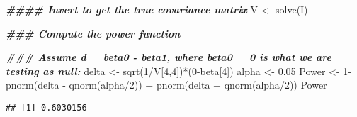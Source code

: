 \documentclass[
]{article}
\newenvironment{Shaded}{\begin{snugshade}}{\end{snugshade}}
\newcommand{\AttributeTok}[1]{\textcolor[rgb]{0.77,0.63,0.00}{#1}}
\newcommand{\ControlFlowTok}[1]{\textcolor[rgb]{0.13,0.29,0.53}{\textbf{#1}}}
\newcommand{\DecValTok}[1]{\textcolor[rgb]{0.00,0.00,0.81}{#1}}
\newcommand{\DocumentationTok}[1]{\textcolor[rgb]{0.56,0.35,0.01}{\textbf{\textit{#1}}}}
\newcommand{\FloatTok}[1]{\textcolor[rgb]{0.00,0.00,0.81}{#1}}
\newcommand{\FunctionTok}[1]{\textcolor[rgb]{0.00,0.00,0.00}{#1}}
\newcommand{\NormalTok}[1]{#1}
\newcommand{\OtherTok}[1]{\textcolor[rgb]{0.56,0.35,0.01}{#1}}
\newcommand{\SpecialCharTok}[1]{\textcolor[rgb]{0.00,0.00,0.00}{#1}}
\newcommand{\StringTok}[1]{\textcolor[rgb]{0.31,0.60,0.02}{#1}}
\begin{document}
\begin{Shaded}
\begin{Highlighting}[]
\DocumentationTok{\#\#\#\# Invert to get the true covariance matrix }
\NormalTok{V }\OtherTok{\textless{}{-}} \FunctionTok{solve}\NormalTok{(I)}


\DocumentationTok{\#\#\# Compute the power function }

\DocumentationTok{\#\#\# Assume d = beta0 {-} beta1, where beta0 = 0 is what we are testing as null:}
\NormalTok{delta }\OtherTok{\textless{}{-}} \FunctionTok{sqrt}\NormalTok{(}\DecValTok{1}\SpecialCharTok{/}\NormalTok{V[}\DecValTok{4}\NormalTok{,}\DecValTok{4}\NormalTok{])}\SpecialCharTok{*}\NormalTok{(}\DecValTok{0}\SpecialCharTok{{-}}\NormalTok{beta[}\DecValTok{4}\NormalTok{])}
\NormalTok{alpha }\OtherTok{\textless{}{-}} \FloatTok{0.05}
\NormalTok{Power }\OtherTok{\textless{}{-}} \DecValTok{1}\SpecialCharTok{{-}} \FunctionTok{pnorm}\NormalTok{(delta }\SpecialCharTok{{-}} \FunctionTok{qnorm}\NormalTok{(alpha}\SpecialCharTok{/}\DecValTok{2}\NormalTok{)) }\SpecialCharTok{+} \FunctionTok{pnorm}\NormalTok{(delta }\SpecialCharTok{+} \FunctionTok{qnorm}\NormalTok{(alpha}\SpecialCharTok{/}\DecValTok{2}\NormalTok{))}
\NormalTok{Power}
\end{Highlighting}
\end{Shaded}

\begin{verbatim}
## [1] 0.6030156
\end{verbatim}

\begin{Shaded}
\end{Shaded}
\end{document}
